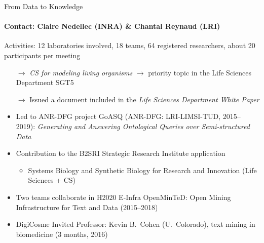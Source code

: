 \begin{frame}{From Data to Knowledge}
\framesubtitle{Contact: Claire Nedellec (INRA) \& Chantal Reynaud (LRI)}
%
Activities: 12 laboratories involved, 18 teams, 64 registered researchers, about 20 participants per meeting
%
\begin{itemize}
  \small
  \item[$\rightarrow$] \emph{CS for modeling living organisms} $\rightarrow$ priority topic in the Life Sciences Department SGT5
  \item[$\rightarrow$] Issued a document included in the \emph{Life Sciences Department White Paper}

\item Led to ANR-DFG project GoASQ (ANR-DFG: LRI-LIMSI-TUD, 2015--2019): \emph{Generating and Answering Ontological Queries over Semi-structured Data}
\item Contribution to the B2SRI Strategic Research Institute application
  \begin{itemize}
  \item Systems Biology and Synthetic Biology for Research and Innovation (Life Sciences + CS)
  \end{itemize}
\item Two teams collaborate in H2020 E-Infra OpenMinTeD: Open Mining Infrastructure for Text and Data (2015--2018)
\item DigiCosme Invited Professor: Kevin B.\ Cohen (U.\ Colorado), text mining in biomedicine (3 months, 2016)
\end{itemize}

{\color{blue} }
\end{frame}


